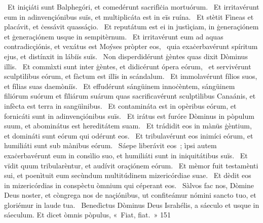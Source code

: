 {~Et iniçiáti sunt Balphegóri, et comedérunt sacrifìċia mortuórum.
~Et irritavérunt eum in adinvençiónibus suïs, et multiplicáta est in eïs ruína.
~Et stètit Fìneas et placávit, et ċessávit quassáçio.
~Et reputátum est ei in justìçiam, in ġeneraçiónem et ġeneraçiónem usque in sempitèrnum.
~Et irritavérunt eum ad aquas contradicçiónis, et vexátus est Moýses pròpter eos,
~quia exaċerbavérunt spíritum ejus, et distínxit in lábiïs suïs.
~Non disperdidérunt ġèntes quas dixit Dòminus illïs.
~Et commìxti sunt inter ġèntes, et didicérunt ópera eórum,
~et servivérunt sculptìlibus eórum, et fàctum est illïs in scándalum.
~Et immolavérunt fílios suos, et fílias suas daemòniïs.
~Et effudérunt sángüinem innoċèntem, sángüinem filiórum suórum et fïliárum suárum quas sacrificavérunt sculptìlibus Canaánis, et infècta est terra in sangüìnibus.
~Et contamináta est in opèribus eórum, et fornicáti sunt in adinvençiónibus suïs.
~Et irátus est furóre Dòminus in pòpulum suum, et abominátus est hereditátem suam.
~Et trádidit eos in mànüs ġèntium, et domináti sunt eórum qui odérunt eos.
~Et tribulavérunt eos inimíci eórum, et humiliáti sunt sub mànibus eórum.
~Sáepe liberávit eos~; ìpsi autem exaċerbavérunt eum in consìlio suo, et humiliáti sunt in iniquitátibus suïs.
~Et vïdit quum tribularèntur, et audívit oraçiónem eórum.
~Et mèmor fuit testamènti sui, et poenìtuit eum secùndum multitúdinem mizericórdiae suae.
~Et dèdit eos in mizericórdias in conspèctu òmnium qui céperant eos.
~Sàlvos fac nos, Dòmine Deus noster, et còngrega nos de naçiónibus, ut confiteámur nómini sancto tuo, et gloriémur in laude tua.
~Benedìctus Dòminus Deus Israhélis, a sáeculo et usque in sáeculum. Et dicet òmnis pòpulus, «~Fiat, fiat.~»
}
{15}{1}

